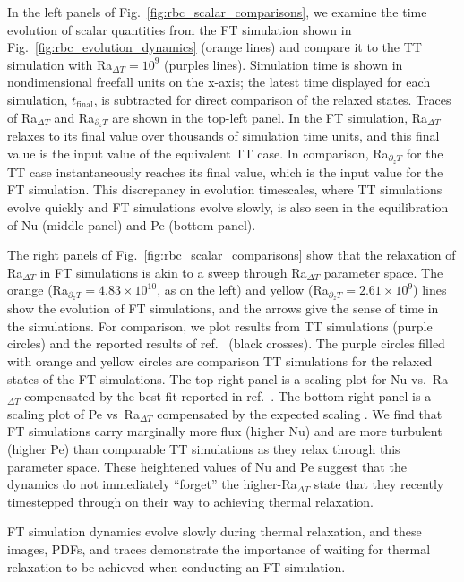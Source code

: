 \documentclass[aps, pre, onecolumn, nofootinbib, notitlepage, groupedaddress, amsfonts, amssymb, amsmath, longbibliography, superscriptaddress]{revtex4-1}
\begin{document}
In the left panels of Fig.~\ref{fig:rbc_scalar_comparisons}, we examine the time evolution of scalar quantities from the FT simulation shown in Fig.~\ref{fig:rbc_evolution_dynamics} (orange lines) and compare it to the TT simulation with Ra$_{\Delta T} = 10^9$ (purples lines).
Simulation time is shown in nondimensional freefall units on the x-axis; the latest time displayed for each simulation, $t_{\text{final}}$, is subtracted for direct comparison of the relaxed states.
Traces of Ra$_{\Delta T}$ and Ra$_{\partial_z T}$ are shown in the top-left panel.
In the FT simulation, Ra$_{\Delta T}$ relaxes to its final value over thousands of simulation time units, and this final value is the input value of the equivalent TT case.
In comparison, Ra$_{\partial_z T}$ for the TT case instantaneously reaches its final value, which is the input value for the FT simulation.
This discrepancy in evolution timescales, where TT simulations evolve quickly and FT simulations evolve slowly, is also seen in the equilibration of Nu (middle panel) and Pe (bottom panel).

The right panels of Fig.~\ref{fig:rbc_scalar_comparisons} show that the relaxation of Ra$_{\Delta T}$ in FT simulations is akin to a sweep through Ra$_{\Delta T}$ parameter space.
The orange (Ra$_{\partial_z T} = 4.83 \times 10^{10}$, as on the left) and yellow (Ra$_{\partial_z T} = 2.61 \times 10^{9}$) lines show the evolution of FT simulations, and the arrows give the sense of time in the simulations.
For comparison, we plot results from TT simulations (purple circles) and the reported results of ref.~\cite{zhu&all2018} (black crosses).
The purple circles filled with orange and yellow circles are comparison TT simulations for the relaxed states of the FT simulations.
The top-right panel is a scaling plot for Nu vs.~Ra$_{\Delta T}$ compensated by the best fit reported in ref.~\cite{johnston&doering2009}.
The bottom-right panel is a scaling plot of Pe vs~Ra$_{\Delta T}$ compensated by the expected scaling \cite{ahlers&all2009}.
We find that FT simulations carry marginally more flux (higher Nu) and are more turbulent (higher Pe) than comparable TT simulations as they relax through this parameter space.
These heightened values of Nu and Pe suggest that the dynamics do not immediately ``forget'' the higher-Ra$_{\Delta T}$ state that they recently timestepped through on their way to achieving thermal relaxation.

FT simulation dynamics evolve slowly during thermal relaxation, and these images, PDFs, and traces demonstrate the importance of waiting for thermal relaxation to be achieved when conducting an FT simulation.
\end{document}
